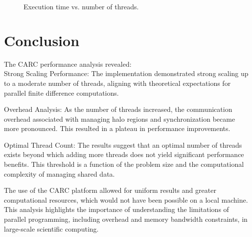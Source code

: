 \documentclass[12pt]{article}
\begin{document}
\begin{figure}[h!]
\centering

\caption{Execution time vs. number of threads.}
\label{fig:time_threads}
\end{figure}

\FloatBarrier

\section{Conclusion}
The CARC performance analysis revealed:\\

Strong Scaling Performance: The implementation demonstrated strong scaling up to a moderate number of threads, aligning with theoretical expectations for parallel finite difference computations.

Overhead Analysis: As the number of threads increased, the communication overhead associated with managing halo regions and synchronization became more pronounced. This resulted in a plateau in performance improvements.

Optimal Thread Count: The results suggest that an optimal number of threads exists beyond which adding more threads does not yield significant performance benefits. This threshold is a function of the problem size and the computational complexity of managing shared data.

The use of the CARC platform allowed for uniform results and greater computational resources, which would not have been possible on a local machine. This analysis highlights the importance of understanding the limitations of parallel programming, including overhead and memory bandwidth constraints, in large-scale scientific computing.
\end{document}
